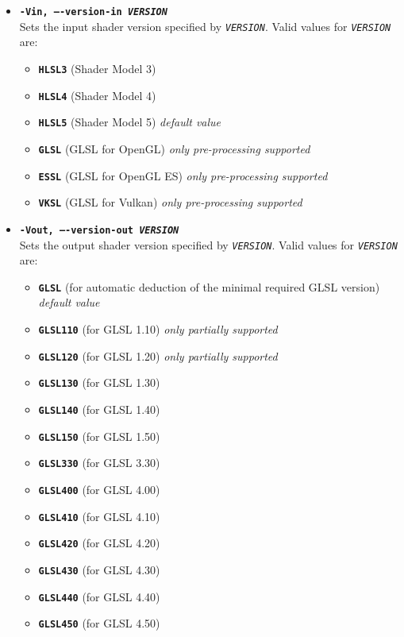 \documentclass{article}
\begin{document}
\begin{itemize}
	\item[] \textbf{\texttt{-Vin, ----version-in \textit{VERSION}}} \\
	Sets the input shader version specified by \texttt{\textit{VERSION}}.
	Valid values for \texttt{\textit{VERSION}} are:
	\begin{itemize}
		\item[] \textbf{\texttt{HLSL3}} (Shader Model 3)
		\item[] \textbf{\texttt{HLSL4}} (Shader Model 4)
		\item[] \textbf{\texttt{HLSL5}} (Shader Model 5) \textit{default value}
		\item[] \textbf{\texttt{GLSL}} (GLSL for OpenGL) \textit{only pre-processing supported}
		\item[] \textbf{\texttt{ESSL}} (GLSL for OpenGL ES) \textit{only pre-processing supported}
		\item[] \textbf{\texttt{VKSL}} (GLSL for Vulkan) \textit{only pre-processing supported}
	\end{itemize}
	
	\item[] \textbf{\texttt{-Vout, ----version-out \textit{VERSION}}} \\
	Sets the output shader version specified by \texttt{\textit{VERSION}}.
	Valid values for \texttt{\textit{VERSION}} are:
	\begin{itemize}
		\item[] \textbf{\texttt{GLSL}} (for automatic deduction of the minimal required GLSL version) \textit{default value}
		\item[] \textbf{\texttt{GLSL110}} (for GLSL 1.10) \textit{only partially supported}
		\item[] \textbf{\texttt{GLSL120}} (for GLSL 1.20) \textit{only partially supported}
		\item[] \textbf{\texttt{GLSL130}} (for GLSL 1.30)
		\item[] \textbf{\texttt{GLSL140}} (for GLSL 1.40)
		\item[] \textbf{\texttt{GLSL150}} (for GLSL 1.50)
		\item[] \textbf{\texttt{GLSL330}} (for GLSL 3.30)
		\item[] \textbf{\texttt{GLSL400}} (for GLSL 4.00)
		\item[] \textbf{\texttt{GLSL410}} (for GLSL 4.10)
		\item[] \textbf{\texttt{GLSL420}} (for GLSL 4.20)
		\item[] \textbf{\texttt{GLSL430}} (for GLSL 4.30)
		\item[] \textbf{\texttt{GLSL440}} (for GLSL 4.40)
		\item[] \textbf{\texttt{GLSL450}} (for GLSL 4.50)
	\end{itemize}
	
\end{itemize}
\end{document}
